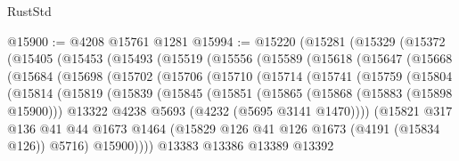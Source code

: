 \begin{lexlean}{RustStd}
\begin{coremodule}
@15900 := @4208 @15761 @1281
@15994 := @15220
    (@15281
      (@15329
        (@15372
          (@15405
            (@15453
              (@15493
                (@15519
                  (@15556
                    (@15589
                      (@15618
                        (@15647
                          (@15668
                            (@15684
                              (@15698
                                (@15702
                                  (@15706
                                    (@15710
                                      (@15714
                                        (@15741
                                          (@15759
                                            (@15804
                                              (@15814
                                                (@15819
                                                  (@15839
                                                    (@15845
                                                      (@15851
                                                        (@15865
                                                          (@15868 (@15883 (@15898 @15900)))
                                                          @13322
                                                          @4238
                                                          @5693
                                                          (@4232 (@5695 @3141 @1470))))
                                                      (@15821
                                                        @317
                                                        @136
                                                        @41
                                                        @44
                                                        @1673
                                                        @1464
                                                        (@15829
                                                          @126
                                                          @41
                                                          @126
                                                          @1673
                                                          (@4191 (@15834 @126))
                                                          @5716)
                                                        @15900))))
                                                @13383
                                                @13386
                                                @13389
                                                @13392

\end{coremodule}
\end{lexlean}
